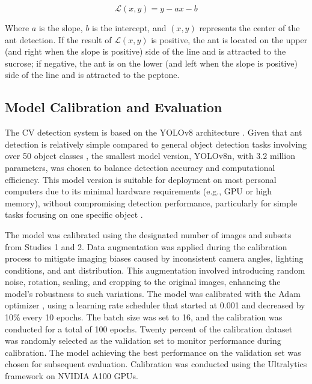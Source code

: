 \begin{equation}
\mathcal{L}(x, y) = y - a x - b
\label{eq3}
\end{equation}

Where $a$ is the slope, $b$ is the intercept, and $(x, y)$ represents the center of the ant detection. If the result of $\mathcal{L}(x, y)$ is positive, the ant is located on the upper (and right when the slope is positive) side of the line and is attracted to the sucrose; if negative, the ant is on the lower (and left when the slope is positive) side of the line and is attracted to the peptone.

\subsection{Model Calibration and Evaluation}

The CV detection system is based on the YOLOv8 architecture \cite{Jocher2023YOLO}. Given that ant detection is relatively simple compared to general object detection tasks involving over 50 object classes \cite{Everingham2010Pascal,Lin2014Microsoft}, the smallest model version, YOLOv8n, with 3.2 million parameters, was chosen to balance detection accuracy and computational efficiency. This model version is suitable for deployment on most personal computers due to its minimal hardware requirements (e.g., GPU or high memory), without compromising detection performance, particularly for simple tasks focusing on one specific object \cite{Das2024Model}.

The model was calibrated using the designated number of images and subsets from Studies 1 and 2. Data augmentation was applied during the calibration process to mitigate imaging biases caused by inconsistent camera angles, lighting conditions, and ant distribution. This augmentation involved introducing random noise, rotation, scaling, and cropping to the original images, enhancing the model’s robustness to such variations. The model was calibrated with the Adam optimizer \cite{Kingma2017Adam}, using a learning rate scheduler that started at 0.001 and decreased by 10\% every 10 epochs. The batch size was set to 16, and the calibration was conducted for a total of 100 epochs. Twenty percent of the calibration dataset was randomly selected as the validation set to monitor performance during calibration. The model achieving the best performance on the validation set was chosen for subsequent evaluation. Calibration was conducted using the Ultralytics framework \cite{Jocher2023YOLO} on NVIDIA A100 GPUs.

